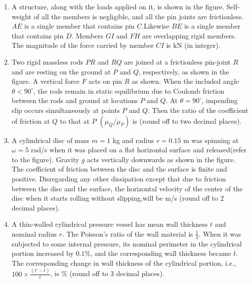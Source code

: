 \documentclass[journal,12pt,onecolumn]{IEEEtran}
\theoremstyle{remark}
\begin{document}
\begin{enumerate}
    \item A structure, along with the loads applied on it, is shown in the figure. Self-weight of all the members is negligible, and all the pin joints are frictionless. $AE$ is a single member that contains pin $C$.Likewise $BE$ is a single member that contains pin $D$. Members $GI$ and $FH$ are overlapping rigid members. The magnitude of the force carried by member $CI$ is {\underline{\hspace{2cm}}} kN (in integer).
     \begin{figure}[H]
        \centering
         
    \end{figure}
    
    \item Two rigid massless rods $PR$ and $RQ$ are joined at a frictionless pin-joint $R$ and are resting on the ground at $P$ and $Q$, respectively, as shown in the figure. A vertical force $F$ acts on pin $R$ as shown. When the included angle $\theta < 90^\circ$, the rods remain in static equilibrium due to Coulomb friction between the rods and ground at locations $P$ and $Q$. At $\theta = 90^\circ$, impending slip occurs simultaneously at points $P$ and $Q$. Then the ratio of the coefficient of friction at $Q$ to that at $P$ $(\mu_Q / \mu_P)$ is {\underline{\hspace{2cm}}} (round off to two decimal places).
     \begin{figure}[H]
        \centering
          
    \end{figure}
    
    \item A cylindrical disc of mass $m = 1$ kg and radius $r = 0.15$ m was spinning at $\omega = 5$ rad/s when it was placed on a flat horizontal surface and released(refer to the figure). Gravity $g$ acts vertically downwards as shown in the figure. The coefficient of friction between the disc and the surface is finite and positive. Disregarding any other dissipation except that due to friction between the disc and the surface, the horizontal velocity of the center of the disc when it starts rolling without slipping,will be{\underline{\hspace{2cm}}} m/s (round off to 2 decimal places).
     \begin{figure}[H]
        \centering
        
    \end{figure}
    
    \item A thin-walled cylindrical pressure vessel has mean wall thickness $t$ and nominal radius $r$. The Poisson's ratio of the wall material is $\frac{1}{3}$. When it was subjected to some internal pressure, its nominal perimeter in the cylindrical portion increased by $0.1\%$, and the corresponding wall thickness became $\bar{t}$. The corresponding change in wall thickness of the cylindrical portion, i.e., $100 \times \frac{(t' - t)}{t}$, is {\underline{\hspace{2cm}}}\% (round off to 3 decimal places).
\end{enumerate}
\end{document}

